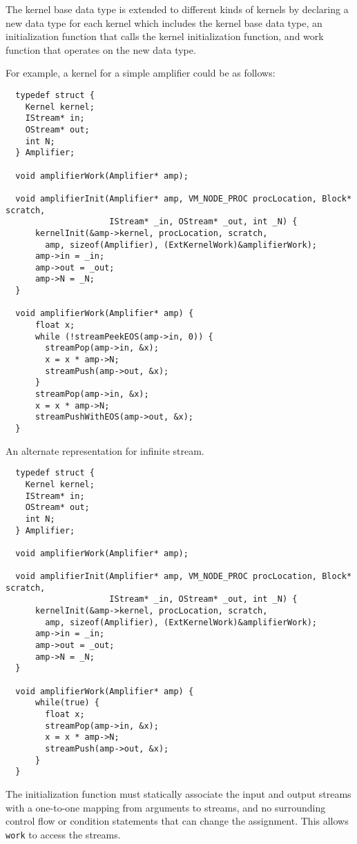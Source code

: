 The kernel base data type is extended to different kinds of kernels by
declaring a new data type for each kernel which includes the kernel
base data type, an initialization function that calls the kernel
initialization function, and work function that operates on the new
data type.

For example, a kernel for a simple amplifier could be as follows:
 
{\small
\begin{verbatim}
  typedef struct {
    Kernel kernel;
    IStream* in;
    OStream* out;
    int N;
  } Amplifier;

  void amplifierWork(Amplifier* amp);

  void amplifierInit(Amplifier* amp, VM_NODE_PROC procLocation, Block* scratch, 
                     IStream* _in, OStream* _out, int _N) {
      kernelInit(&amp->kernel, procLocation, scratch, 
        amp, sizeof(Amplifier), (ExtKernelWork)&amplifierWork);
      amp->in = _in;
      amp->out = _out;
      amp->N = _N;
  }
 
  void amplifierWork(Amplifier* amp) {
      float x;
      while (!streamPeekEOS(amp->in, 0)) {
        streamPop(amp->in, &x);
        x = x * amp->N;
        streamPush(amp->out, &x);
      }
      streamPop(amp->in, &x);
      x = x * amp->N;
      streamPushWithEOS(amp->out, &x);
  }
\end{verbatim}}


An alternate representation for infinite stream.
{\small
\begin{verbatim}
  typedef struct {
    Kernel kernel;
    IStream* in;
    OStream* out;
    int N;
  } Amplifier;

  void amplifierWork(Amplifier* amp);

  void amplifierInit(Amplifier* amp, VM_NODE_PROC procLocation, Block* scratch, 
                     IStream* _in, OStream* _out, int _N) {
      kernelInit(&amp->kernel, procLocation, scratch, 
        amp, sizeof(Amplifier), (ExtKernelWork)&amplifierWork);
      amp->in = _in;
      amp->out = _out;
      amp->N = _N;
  }

  void amplifierWork(Amplifier* amp) {
      while(true) {
        float x;
        streamPop(amp->in, &x);
        x = x * amp->N;
        streamPush(amp->out, &x);
      }
  }
\end{verbatim}}



The initialization function must statically associate the input and
output streams with a one-to-one mapping from arguments to streams,
and no surrounding control flow or condition statements that can
change the assignment.  This allows {\tt work} to access the streams.

